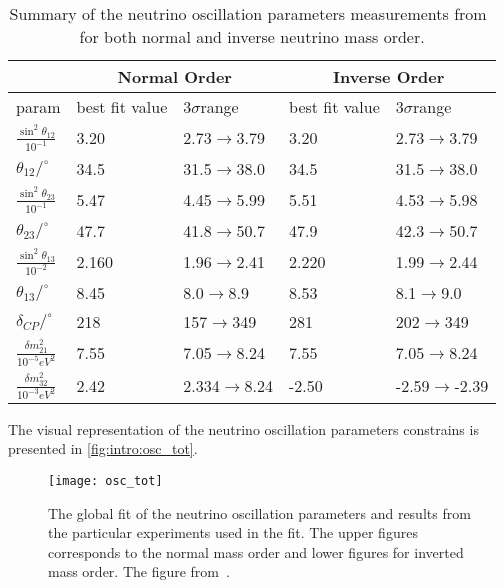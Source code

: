 \documentclass[../main.tex]{subfiles}
\begin{document}
\begin{table}[!ht]
\centering
  \begin{tabular}{||l|ll||ll|}
  \hline
  & \multicolumn{2}{c}{Normal Order} & \multicolumn{2}{c}{Inverse Order} \\
  \hline
  param                                   & best fit value  & 3$\sigma$range    & best fit value  & 3$\sigma$range \\
  \hline
  $\frac{\sin^2\theta_{12}}{10^{-1}}$     & 3.20            & 2.73$\to$3.79     & 3.20            & 2.73$\to$3.79 \\
  $\theta_{12}/^\circ$                    & 34.5            & 31.5$\to$38.0     & 34.5            & 31.5$\to$38.0 \\
  $\frac{\sin^2\theta_{23}}{10^{-1}}$     & 5.47            & 4.45$\to$5.99     & 5.51            & 4.53$\to$5.98 \\
  $\theta_{23}/^\circ$                    & 47.7            & 41.8$\to$50.7     & 47.9            & 42.3$\to$50.7 \\
  $\frac{\sin^2\theta_{13}}{10^{-2}}$     & 2.160           & 1.96$\to$2.41     & 2.220           & 1.99$\to$2.44 \\
  $\theta_{13}/^\circ$                    & 8.45            & 8.0$\to$8.9       & 8.53            & 8.1$\to$9.0 \\
  $\delta_{CP}/^\circ$                    & 218             & 157$\to$349       & 281             & 202$\to$349 \\
  $\frac{\delta m_{21}^2}{10^{-5}eV^2}$   & 7.55            & 7.05$\to$8.24     & 7.55            & 7.05$\to$8.24 \\
  $\frac{\delta m_{32}^2}{10^{-3}eV^2}$   & 2.42            & 2.334$\to$8.24    & -2.50           & -2.59$\to$-2.39 \\
  \hline

  \end{tabular}
  \caption{Summary of the neutrino oscillation parameters measurements from~\cite{Tanabashi2018} for both normal and inverse neutrino mass order.}
  \label{tbl:intro:osc}
\end{table}

The visual representation of the neutrino oscillation parameters constrains is presented in \autoref{fig:intro:osc_tot}.

\begin{figure}
  \centering
  \texttt{[image: osc\_tot]}
  \caption{The global fit of the neutrino oscillation parameters and results from the particular experiments used in the fit. The upper figures corresponds to the normal mass order and lower figures for inverted mass order. The figure from~\cite{Esteban2019}.}
  \label{fig:intro:osc_tot}
\end{figure}
\end{document}
